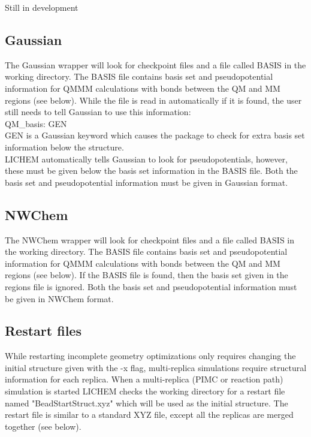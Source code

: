 \documentclass[12pt]{report}
\begin{document}
{\color{red}Still in development}

\subsection{Gaussian}

The Gaussian wrapper will look for checkpoint files and a file called BASIS in
the working directory.
The BASIS file contains basis set and pseudopotential information for QMMM
calculations with bonds between the QM and MM regions (see below).
While the file is read in automatically if it is found, the user still needs
to tell Gaussian to use this information: \\

QM\_basis: GEN \\

GEN is a Gaussian keyword which causes the package to check for extra basis
set information below the structure. \\

LICHEM automatically tells Gaussian to look for pseudopotentials, however,
these must be given below the basis set information in the BASIS file.
Both the basis set and pseudopotential information must be given in Gaussian
format.

\subsection{NWChem}

The NWChem wrapper will look for checkpoint files and a file called BASIS in
the working directory.
The BASIS file contains basis set and pseudopotential information for QMMM
calculations with bonds between the QM and MM regions (see below).
If the BASIS file is found, then the basis set given in the regions file is
ignored.
Both the basis set and pseudopotential information must be given in NWChem
format.

\subsection{Restart files}

While restarting incomplete geometry optimizations only requires changing
the initial structure given with the -x flag, multi-replica simulations
require structural information for each replica.
When a multi-replica (PIMC or reaction path) simulation is started LICHEM
checks the working directory for a restart file named "BeadStartStruct.xyz"
which will be used as the initial structure.
The restart file is similar to a standard XYZ file, except all the replicas
are merged together (see below). \\
\end{document}
